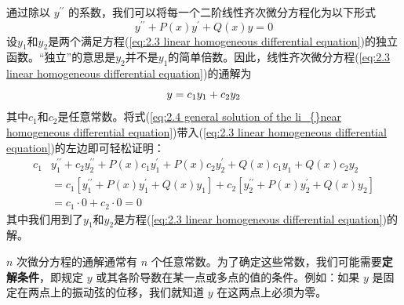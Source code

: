 	通过除以 $y^{\prime \prime}$ 的系数，我们可以将每一个二阶线性齐次微分方程化为以下形式
	\begin{equation}
		y^{\prime\prime}+P\left(x\right)y^{\prime}+Q\left(x\right)y=0
		\label{eq:2.3 linear homogeneous differential equation}
	\end{equation}
	设$y_1$和$y_2$是两个满足方程(\ref{eq:2.3 linear homogeneous differential equation})的独立函数。“独立”的意思是$y_2$并不是$y_1$的简单倍数。因此，线性齐次微分方程(\ref{eq:2.3 linear homogeneous differential equation})的通解为
	\begin{equation}
		y = c_1y_1+c_2y_2
		\label{eq:2.4 general solution of the li_{}near homogeneous differential equation}
	\end{equation}
	其中$c_1$和$c_2$是任意常数。将式(\ref{eq:2.4 general solution of the li_{}near homogeneous differential equation})带入(\ref{eq:2.3 linear homogeneous differential equation})的左边即可轻松证明：
	\begin{equation}
		\begin{aligned}
			c_1 & y_1^{\prime\prime}+c_2y_2^{\prime\prime}+P\left(x\right)c_1y_1^{\prime}+P\left(x\right)c_2y_2^{\prime}+Q\left(x\right)c_1y_1+Q\left(x\right)c_2y_2\\
			& = c_1\left[	y_1^{\prime\prime}+P\left(x\right)y_1^{\prime}+Q\left(x\right)y_1\right]+c_2\left[	y_2^{\prime\prime}+P\left(x\right)y_2^{\prime}+Q\left(x\right)y_2\right]\\
			& = c_1 \cdot 0 + c_2 \cdot 0 = 0
		\end{aligned}
		\label{eq:2.5}
	\end{equation}
	其中我们用到了$y_1$和$y_2$是方程(\ref{eq:2.3 linear homogeneous differential equation})的解。

	$n$ 次微分方程的通解通常有 $n$ 个任意常数。为了确定这些常数，我们可能需要\textbf{定解条件}，即规定 $y$ 或其各阶导数在某一点或多点的值的条件。例如：如果 $y$ 是固定在两点上的振动弦的位移，我们就知道 $y$ 在这两点上必须为零。

